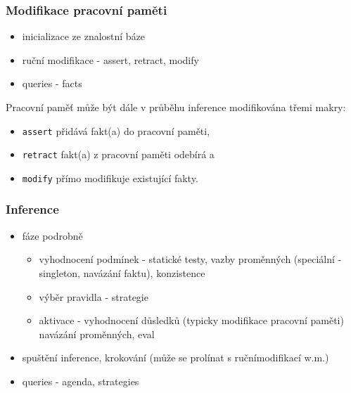 


\subsubsection{Modifikace pracovní paměti}
\label{modifikace}
\begin{framed}
  \begin{itemize}
    \item inicializace ze znalostní báze
    \item ruční modifikace - assert, retract, modify
    \item queries - facts
  \end{itemize}
\end{framed}

Pracovní paměť může být dále v průběhu inference modifikována třemi makry:
\begin{itemize}
  \item \verb|assert| přidává fakt(a) do pracovní paměti,
  \item \verb|retract| fakt(a) z pracovní paměti odebírá a
  \item \verb|modify| přímo modifikuje existující fakty.
\end{itemize}

\subsubsection{Inference}
\label{inference}
\begin{framed}
  \begin{itemize}
    \item fáze podrobně
    \begin{itemize}
      \item vyhodnocení podmínek - statické testy, vazby proměnných (speciální -
        singleton, navázání faktu), konzistence
      \item výběr pravidla - strategie
      \item aktivace - vyhodnocení důsledků (typicky modifikace pracovní paměti)
        navázání proměnných, eval
    \end{itemize}
    \item spuštění inference, krokování (může se prolínat s ručnímodifikací w.m.)
    \item queries - agenda, strategies
  \end{itemize}
\end{framed}

